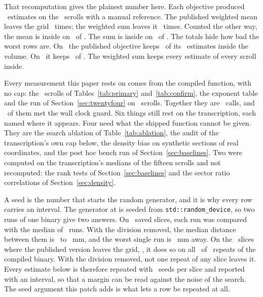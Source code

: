 That recomputation gives the plainest number here. Each objective produced \RevCppInsideAsIsOf\
estimates on the \RevCppScrollsMeasured\ scrolls with a manual reference. The published weighted
mean leaves the grid \RevCppOutsideAsIs\ times; the weighted sum leaves it \RevCppOutsideSum\ times.
Counted the other way, the mean is inside on \RevCppInsideAsIs\ of \RevCppInsideAsIsOf. The sum is
inside on \RevCppInsideSum\ of \RevCppInsideSumOf. The totals hide how bad the worst rows are. On
\RevCppInsideWorstOne\ the published objective keeps \RevCppInsideWorstOneIn\ of its
\RevCppInsideWorstOneOf\ estimates inside the volume. On \RevCppInsideWorstTwo\ it keeps
\RevCppInsideWorstTwoIn\ of \RevCppInsideWorstTwoOf. The weighted sum keeps every estimate of every
scroll inside.

Every measurement this paper rests on comes from the compiled function, with no cap: the
\RevCppScrollsMeasured\ scrolls of Tables~\ref{tab:primary} and~\ref{tab:confirm}, the exponent
table and the run of Section~\ref{sec:twentyfour} on \RevRunScrolls\ scrolls. Together they are
\RevCppAllEstimates\ calls, and \RevCppAllGuardHits\ of them met the wall clock guard. Six things
still rest on the transcription, each named where it appears. Four need what the shipped function
cannot be given. They are the search ablation of Table~\ref{tab:ablation}, the audit of the
transcription's own cap below, the density bias on synthetic sections of real coordinates, and
the post hoc bench run of Section~\ref{sec:baselines}. Two were computed on the
transcription's medians of the fifteen scrolls and not recomputed: the rank tests of
Section~\ref{sec:baselines} and the sector ratio correlations of Section~\ref{sec:density}.

A seed is the number that starts the random generator, and it is why every row carries an
interval. The generator at \cppline{51} is seeded from \texttt{std::random\_device}, so two runs of
one binary give two answers. On \UmbNoiseSlices\ saved slices, each run was compared with the
median of \UmbCppRepeats\ runs. With the division removed, the median distance between them is
\UmbNoiseMedianLow\ to \UmbNoiseMedianHigh~mm, and the worst single run is \UmbNoiseWorst~mm away.
On the \RevNoiseAsIsLeaving\ slices where the published version leaves the grid, \RevNoiseAsIsLeavingSlices,
it does so on all \UmbCppRunawayOutside\ of \UmbCppRepeats\ repeats of the compiled binary. With the division removed, not one repeat of any slice leaves it.
Every estimate below is therefore repeated with \RevKSeeds\ seeds per slice and reported with an
interval, so that a margin can be read against the noise of the search. The seed argument this
patch adds is what lets a row be repeated at all.

